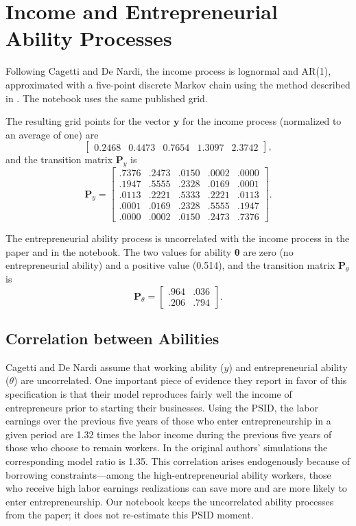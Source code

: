 \documentclass[\latexroot/\projectname]{subfiles}
\begin{document}
\FloatBarrier
\section{Income and Entrepreneurial Ability Processes}
\whenintegrated{\label{sec:appendix-hank}}

Following Cagetti and De Nardi, the income process is lognormal and AR(1), approximated with a five-point discrete Markov chain using the method described in \cite{Tauchen1991-oe}. The notebook uses the same published grid.

The resulting grid points for the vector $\mathbf{y}$ for the income process (normalized to an average of one) are
\[
  \begin{bmatrix} 0.2468 & 0.4473 & 0.7654 & 1.3097 & 2.3742 \end{bmatrix},
\]
and the transition matrix $\mathbf{P}_y$ is
\[
  \mathbf{P}_y = \begin{bmatrix}
    .7376 & .2473 & .0150 & .0002 & .0000 \\
    .1947 & .5555 & .2328 & .0169 & .0001 \\
    .0113 & .2221 & .5333 & .2221 & .0113 \\
    .0001 & .0169 & .2328 & .5555 & .1947 \\
    .0000 & .0002 & .0150 & .2473 & .7376
  \end{bmatrix}.
\]

The entrepreneurial ability process is uncorrelated with the income process in the paper and in the notebook. The two values for ability $\boldsymbol{\theta}$ are zero (no entrepreneurial ability) and a positive value (0.514), and the transition matrix $\mathbf{P}_\theta$ is
\[
  \mathbf{P}_\theta = \begin{bmatrix}
    .964 & .036 \\
    .206 & .794
  \end{bmatrix}.
\]

\subsection{Correlation between Abilities}

Cagetti and De Nardi assume that working ability ($y$) and entrepreneurial ability ($\theta$) are uncorrelated. One important piece of evidence they report in favor of this specification is that their model reproduces fairly well the income of entrepreneurs prior to starting their businesses. Using the PSID, the labor earnings over the previous five years of those who enter entrepreneurship in a given period are 1.32 times the labor income during the previous five years of those who choose to remain workers. In the original authors' simulations the corresponding model ratio is 1.35. This correlation arises endogenously because of borrowing constraints---among the high-entrepreneurial ability workers, those who receive high labor earnings realizations can save more and are more likely to enter entrepreneurship. Our notebook keeps the uncorrelated ability processes from the paper; it does not re-estimate this PSID moment.
\end{document}
